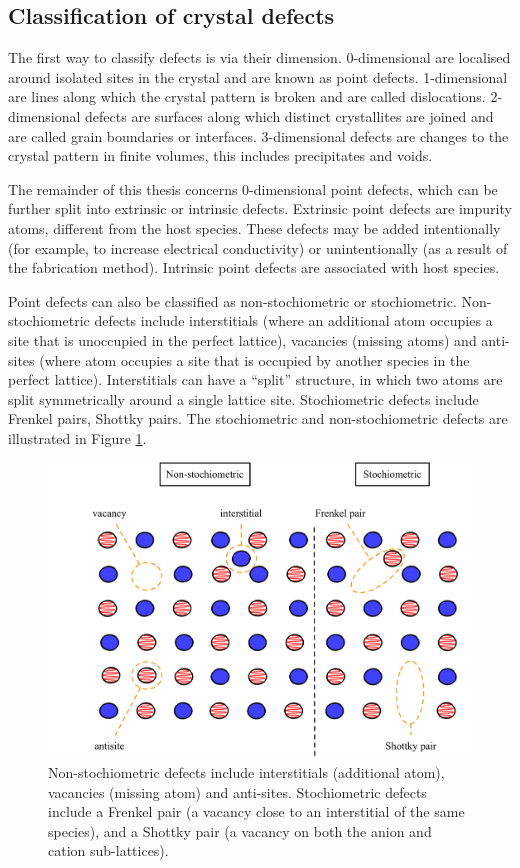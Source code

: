 \subsection{Classification of crystal defects}

The first way to classify defects is via their dimension. 0-dimensional are localised around isolated sites in the crystal and are known as point defects. 1-dimensional are lines along which the crystal pattern is broken and are called dislocations. 2-dimensional defects are surfaces along which distinct crystallites are joined and are called grain boundaries or interfaces. 3-dimensional defects are changes to the crystal pattern in finite volumes, this includes precipitates and voids. 

The remainder of this thesis concerns 0-dimensional point defects, which can be further split into extrinsic or intrinsic defects. Extrinsic point defects are impurity atoms, different from the host species. These defects may be added intentionally (for example, to increase electrical conductivity) or unintentionally (as a result of the fabrication method). Intrinsic point defects are associated with host species.

Point defects can also be classified as non-stochiometric or stochiometric. Non-stochiometric defects include interstitials (where an additional atom occupies a site that is unoccupied in the perfect lattice), vacancies (missing atoms) and anti-sites (where atom occupies a site that is occupied by another species in the perfect lattice). Interstitials can have a ``split'' structure, in which two atoms are split symmetrically around a single lattice site. Stochiometric defects include Frenkel pairs, Shottky pairs. The stochiometric and non-stochiometric defects are illustrated in Figure \ref{classification}.

\begin{figure}[h]
\centering
  \includegraphics[resolution=450]{figures/ch3/classification.png}
  \caption[Classification of crystal point-defects]{Non-stochiometric defects include interstitials (additional atom), vacancies (missing atom) and anti-sites. Stochiometric defects include a Frenkel pair (a vacancy close to an interstitial of the same species), and a Shottky pair (a vacancy on both the anion and cation sub-lattices).}
  \label{classification}
\end{figure}

